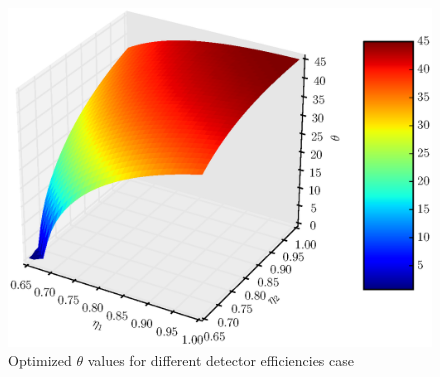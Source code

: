 \documentclass[%
master,         %
subf,           %
href,           %
colorlinks=true %
]{disser}
\numberwithin{equation}{section}
\numberwithin{figure}{section}
\begin{document}
\begin{figure}[h]
\includegraphics[scale=0.7]{theta3d.eps}
\caption{Optimized $\theta$ values for different detector efficiencies case}
\label{fig:theta_opt_3d}
\end{figure}
\end{document}
